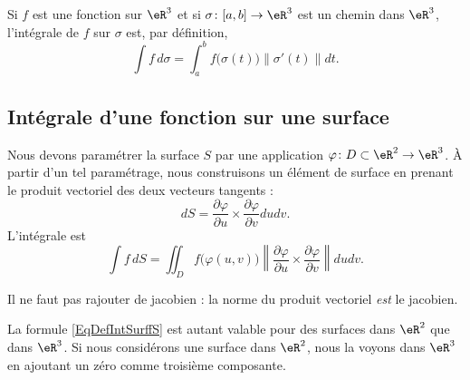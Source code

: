 Si \( f\) est une fonction sur \( \eR^3\) et si \( \sigma\colon \mathopen[ a , b \mathclose]\to \eR^3\) est un chemin dans \( \eR^3\), l'intégrale de \( f\) sur \( \sigma\) est, par définition,
\begin{equation}
	\int f\,d\sigma=\int_a^b f\big( \sigma(t) \big)\| \sigma'(t) \|dt.
\end{equation}

\subsection{Intégrale d'une fonction sur une surface}

Nous devons paramétrer la surface \( S\) par une application \( \varphi\colon D\subset\eR^2\to \eR^3\). À partir d'un tel paramétrage, nous construisons un élément de surface en prenant le produit vectoriel des deux vecteurs tangents :
\begin{equation}
	dS=\frac{ \partial \varphi }{ \partial u }\times\frac{ \partial \varphi }{ \partial v }dudv.
\end{equation}
L'intégrale est
\begin{equation}        \label{EqDefIntSurffS}
	\int f\,dS=\iint_Df\big( \varphi(u,v) \big)\left\| \frac{ \partial \varphi }{ \partial u }\times\frac{ \partial \varphi }{ \partial v } \right\|dudv.
\end{equation}

Il ne faut pas rajouter de jacobien : la norme du produit vectoriel \emph{est} le jacobien.

\begin{remark}
	La formule \eqref{EqDefIntSurffS} est autant valable pour des surfaces dans \( \eR^2\) que dans \( \eR^3\). Si nous considérons une surface dans \( \eR^2\), nous la voyons dans \( \eR^3\) en ajoutant un zéro comme troisième composante.
\end{remark}

